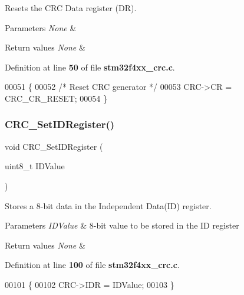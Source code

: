 Resets the C\+RC Data register (DR). 


\begin{DoxyParams}{Parameters}
{\em None} & \\
\hline
\end{DoxyParams}

\begin{DoxyRetVals}{Return values}
{\em None} & \\
\hline
\end{DoxyRetVals}


Definition at line \textbf{ 50} of file \textbf{ stm32f4xx\+\_\+crc.\+c}.


\begin{DoxyCode}
00051 \{
00052   \textcolor{comment}{/* Reset CRC generator */}
00053   CRC->CR = CRC_CR_RESET;
00054 \}
\end{DoxyCode}
\mbox{\label{group__CRC_ga769c9a42be57b972ae61bbada0f2e46a}} 
\subsubsection{C\+R\+C\+\_\+\+Set\+I\+D\+Register()}
{\footnotesize\ttfamily void C\+R\+C\+\_\+\+Set\+I\+D\+Register (\begin{DoxyParamCaption}\item[{uint8\+\_\+t}]{I\+D\+Value }\end{DoxyParamCaption})}



Stores a 8-\/bit data in the Independent Data(\+I\+D) register. 


\begin{DoxyParams}{Parameters}
{\em I\+D\+Value} & 8-\/bit value to be stored in the ID register \\
\hline
\end{DoxyParams}

\begin{DoxyRetVals}{Return values}
{\em None} & \\
\hline
\end{DoxyRetVals}


Definition at line \textbf{ 100} of file \textbf{ stm32f4xx\+\_\+crc.\+c}.


\begin{DoxyCode}
00101 \{
00102   CRC->IDR = IDValue;
00103 \}
\end{DoxyCode}
